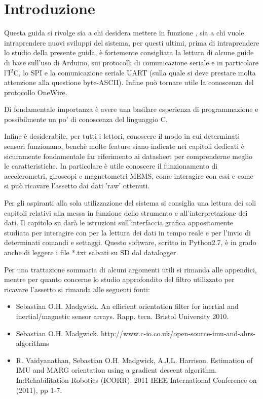 
\chapter{Introduzione}

Questa guida si rivolge sia a chi desidera mettere in funzione \name, sia a chi vuole intraprendere nuovi sviluppi del sistema, per questi ultimi, prima di intraprendere lo studio della presente guida, è fortemente consigliata la lettura di alcune guide di base sull'uso di Arduino, sui protocolli di comunicazione seriale e in particolare l'I$^2$C, lo SPI e la comunicazione seriale UART (sulla quale si deve prestare molta attenzione alla questione byte-ASCII). Infine può tornare utile la conoscenza del protocollo OneWire.

Di fondamentale importanza è avere una basilare esperienza di programmazione e possibilmente un po' di conoscenza del linguaggio C.

Infine è desiderabile, per tutti i lettori, conoscere il modo in cui determinati sensori funzionano, benchè molte feature siano indicate nei capitoli dedicati è sicuramente fondamentale far riferimento ai datasheet per comprenderne meglio le caratteristiche. In particolare è utile conoscere il funzionamento di accelerometri, giroscopi e magnetometri MEMS, come interagire con essi e come si può ricavare l'assetto dai dati 'raw' ottenuti.

Per gli aspiranti alla sola utilizzazione del sistema si consiglia una lettura dei soli capitoli relativi alla messa in funzione dello strumento e all'interpretazione dei dati. Il capitolo su \software darà le istruzioni sull'interfaccia grafica appositamente studiata per interagire con \name per la lettura dei dati in tempo reale e per l'invio di determinati comandi e settaggi.
Questo software, scritto in Python2.7, è in grado anche di leggere i file *.txt salvati su SD dal datalogger.

Per una trattazione sommaria di alcuni argomenti utili si rimanda alle appendici, mentre per quanto concerne lo studio approfondito del filtro utilizzato per ricavare l'assetto si rimanda alle seguenti fonti:

\begin{itemize}
\item Sebastian O.H. Madgwick. An efficient orientation filter for inertial and inertial/magnetic sensor arrays. Rapp. tecn. Bristol University 2010.
\item Sebastian O.H. Madgwick. http://www.c-io.co.uk/open-source-imu-and-ahrs-algorithms
\item R. Vaidyanathan, Sebastian O.H. Madgwick, A.J.L. Harrison. Estimation of IMU and MARG orientation using a gradient descent algorithm. In:Rehabilitation Robotics (ICORR), 2011 IEEE International Conference on (2011), pp 1-7.
\end{itemize}
